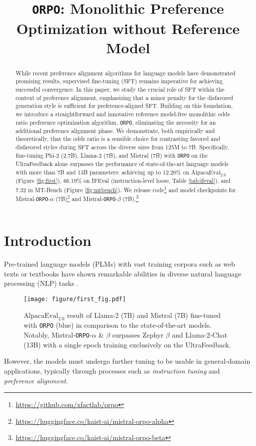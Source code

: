 \title{\texttt{ORPO}: Monolithic Preference Optimization without Reference Model}



\maketitle

\begin{abstract}
While recent preference alignment algorithms for language models have demonstrated promising results, supervised fine-tuning (SFT) remains imperative for achieving successful convergence. In this paper, we study the crucial role of SFT within the context of preference alignment, emphasizing that a minor penalty for the disfavored generation style is sufficient for preference-aligned SFT. Building on this foundation, we introduce a straightforward and innovative reference model-free monolithic odds ratio preference optimization algorithm, \texttt{ORPO}, eliminating the necessity for an additional preference alignment phase. We demonstrate, both empirically and theoretically, that the odds ratio is a sensible choice for contrasting favored and disfavored styles during SFT across the diverse sizes from 125M to 7B. Specifically, fine-tuning Phi-2 (2.7B), Llama-2 (7B), and Mistral (7B) with \texttt{ORPO} on the UltraFeedback alone surpasses the performance of state-of-the-art language models with more than 7B and 13B parameters: achieving up to 12.20\% on $\text{AlpacaEval}_{2.0}$ (Figure \ref{fig:first}), 66.19\% on IFEval (instruction-level loose, Table \ref{tab:ifeval}), and 7.32 in MT-Bench (Figure \ref{fig:mtbench}). We release code\footnote{\url{https://github.com/xfactlab/orpo}} and model checkpoints for Mistral-\texttt{ORPO}-$\alpha$ (7B)\footnote{\url{https://huggingface.co/kaist-ai/mistral-orpo-alpha}} and Mistral-\texttt{ORPO}-$\beta$ (7B).\footnote{\url{https://huggingface.co/kaist-ai/mistral-orpo-beta}}
\end{abstract}

\setlength{\jot}{10pt}
\section{Introduction}
Pre-trained language models (PLMs) with vast training corpora such as web texts \citep{Gokaslan2019OpenWeb, penedo2023refinedweb} or textbooks \citep{li2023textbooks} have shown remarkable abilities in diverse natural language processing (NLP) tasks \citep{NEURIPS2020_1457c0d6, zhang2022opt, touvron2023llama, jiang2023mistral, almazrouei2023falcon}. 
\begin{figure}[hbt]
    \centering
    \texttt{[image: figure/first\_fig.pdf]}
    \caption{$\text{AlpacaEval}_{2.0}$ result of Llama-2 (7B) and Mistral (7B) fine-tuned with \texttt{ORPO} (blue) in comparison to the state-of-the-art models. Notably, Mistral-\texttt{ORPO}-$\alpha$ \& $\beta$ surpasses Zephyr $\beta$ and Llama-2-Chat (13B) with a single epoch training exclusively on the UltraFeedback.}
    \label{fig:first}
\end{figure}However, the models must undergo further tuning to be usable in general-domain applications, typically through processes such as \textit{instruction tuning} and \textit{preference alignment}. 


